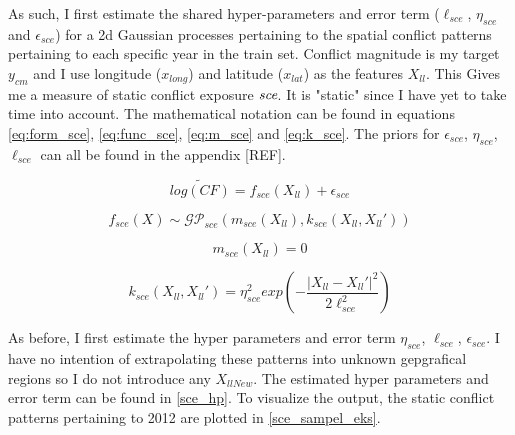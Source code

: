 \documentclass[a4paper]{article}
\begin{document}
As such, I first estimate the shared hyper-parameters and error term ($\ell_{sce}$, $\eta_{sce}$ and $\epsilon_{sce}$) for a 2d Gaussian processes pertaining to the spatial conflict patterns pertaining to each specific year in the train set. Conflict magnitude is my target $y_{cm}$ and I use longitude ($x_{long}$) and latitude ($x_{lat}$) as the features $X_{ll}$. This Gives me a measure of static conflict exposure $\emph{sce}$. It is "static" since I have yet to take time into account. The mathematical notation can be found in equations \ref{eq:form_sce}, \ref{eq:func_sce}, \ref{eq:m_sce} and \ref{eq:k_sce}.  The priors for $\epsilon_{sce}$, $\eta_{sce}$, $\ell_{sce}$ can all be found in the appendix [REF].\par

\[
\widetilde{log(CF)} = f_{sce}(X_{ll}) + \epsilon_{sce} \tag{23} \label{eq:form_sce}
\]

\[
f_{sce}(X) \sim \mathcal{GP}_{sce}(m_{sce}(X_{ll}),k_{sce}(X_{ll},X_{ll}')) \tag{24} \label{eq:func_sce}
\]

\[
m_{sce}(X_{ll}) = 0 \tag{25} \label{eq:m_sce}
\]

\[
k_{sce}(X_{ll},X_{ll}') = \eta_{sce}^2 exp\left(-\frac{|X_{ll}-X_{ll}'|^2}{2\ell_{sce}^2}\right) \tag{26} \label{eq:k_sce}
\]

As before, I first estimate the hyper parameters and error term $\eta_{sce}$, $\ell_{sce}$, $\epsilon_{sce}$. I have no intention of extrapolating these patterns into unknown gepgrafical regions so I do not introduce any $X_{llNew}$.  The estimated hyper parameters and error term can be found in \autoref{sce_hp}. To visualize the output, the static conflict patterns pertaining to 2012 are plotted in \autoref{sce_sampel_eks}.\par
\end{document}
